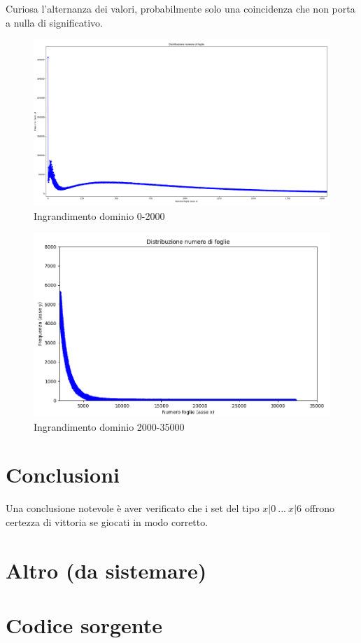 \documentclass[a4paper,12pt]{report}
\begin{document}
Curiosa l'alternanza dei valori, probabilmente solo una coincidenza che non porta a nulla di significativo.

\begin{figure}[h!]
    \centering
    \includegraphics[width=1\textwidth]{imgs/grafico_0_2000.png} 
    \caption{Ingrandimento dominio 0-2000}
    \label{fig:etichetta}
\end{figure}

\begin{figure}[h!]
    \centering
    \includegraphics[width=1\textwidth]{imgs/grafico_2000_35000.png} 
    \caption{Ingrandimento dominio 2000-35000}
    \label{fig:etichetta}
\end{figure}


\chapter{Conclusioni}

Una conclusione notevole è aver verificato che i set del tipo \(x|0\ ...\ x|6\) offrono certezza di vittoria se giocati in modo corretto.

\chapter{Altro (da sistemare)}





\appendix
\chapter{Codice sorgente}

\end{document}
